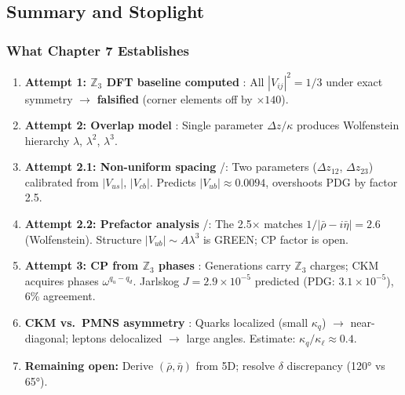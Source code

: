 \subsection{Summary and Stoplight}
\label{sec:ch7_summary}

\subsubsection{What Chapter 7 Establishes}

\begin{tcolorbox}[colback=green!5, colframe=green!50!black,
    title=\textbf{Chapter 7 Summary}]
\begin{enumerate}[nosep]
    \item \textbf{Attempt 1: $\mathbb{Z}_3$ DFT baseline computed} \tagDc{}:
          All $|V_{ij}|^2 = 1/3$ under exact symmetry $\to$ \textbf{falsified}
          (corner elements off by $\times 140$).
    \item \textbf{Attempt 2: Overlap model} \tagDc{}:
          Single parameter $\Delta z/\kappa$ produces Wolfenstein hierarchy
          $\lambda$, $\lambda^2$, $\lambda^3$.
    \item \textbf{Attempt 2.1: Non-uniform spacing} \tagDc{}/\tagCal{}:
          Two parameters ($\Delta z_{12}$, $\Delta z_{23}$) calibrated from $|V_{us}|$, $|V_{cb}|$.
          Predicts $|V_{ub}| \approx 0.0094$, overshoots PDG by factor 2.5.
    \item \textbf{Attempt 2.2: Prefactor analysis} \tagDc{}/\tagI{}:
          The 2.5$\times$ matches $1/|\bar\rho{-}i\bar\eta| = 2.6$ (Wolfenstein).
          Structure $|V_{ub}| \sim A\lambda^3$ is GREEN; CP factor is open.
    \item \textbf{Attempt 3: CP from $\mathbb{Z}_3$ phases} \tagDc{}:
          Generations carry $\mathbb{Z}_3$ charges; CKM acquires phases $\omega^{q_u - q_d}$.
          Jarlskog $J = 2.9 \times 10^{-5}$ predicted (PDG: $3.1 \times 10^{-5}$), 6\% agreement.
    \item \textbf{CKM vs.\ PMNS asymmetry} \tagI{}:
          Quarks localized (small $\kappa_q$) $\to$ near-diagonal;
          leptons delocalized $\to$ large angles. Estimate: $\kappa_q/\kappa_\ell \approx 0.4$.
    \item \textbf{Remaining open:}
          Derive $(\bar\rho, \bar\eta)$ from 5D; resolve $\delta$ discrepancy (120° vs 65°).
\end{enumerate}
\end{tcolorbox}

